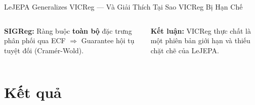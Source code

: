 \documentclass[aspectratio=169,9pt]{beamer}
\begin{document}
\begin{frame}{LeJEPA Generalizes VICReg — Và Giải Thích Tại Sao VICReg Bị Hạn Chế}
\begin{columns}[T]
\vspace{0.6em}
\begin{goodbox}
\footnotesize \textbf{SIGReg:} Ràng buộc \textbf{toàn bộ} đặc trưng phân phối qua ECF $\Rightarrow$ Guarantee hội tụ tuyệt đối (Cramér-Wold).
\end{goodbox}

\vspace{0.6em}
\begin{accentbox}
\footnotesize \textbf{Kết luận:} VICReg thực chất là một phiên bản giới hạn và thiếu chặt chẽ của LeJEPA.
\end{accentbox}

\end{columns}
\end{frame}


\section{Kết quả}
\end{document}
